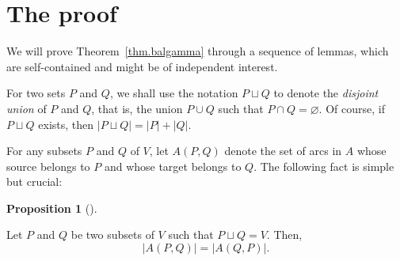 \documentclass[numbers=enddot,12pt,final,onecolumn,notitlepage]{scrartcl}%
\theoremstyle{definition}
\newtheorem{prop}[theo]{Proposition}
\newenvironment{proposition}[1][]
{\begin{prop}[#1]\begin{leftbar}}
{\end{leftbar}\end{prop}}
\theoremstyle{plainsl}
\begin{document}
\section{The proof}

We will prove Theorem~\ref{thm.balgamma} through a sequence of lemmas, which are self-contained and might be of independent interest.

For two sets $P$ and $Q$, we shall use the notation $P \sqcup Q$ to denote the \textit{disjoint union} of $P$ and $Q$, that is, the union $P \cup Q$ such that $P \cap Q = \varnothing$. Of course, if $P \sqcup Q$ exists, then $|P \sqcup Q| =|P|+|Q|$.

For any subsets $P$ and $Q$ of $V$, let $A(P,Q)$ denote the set of arcs in $A$ whose source belongs to $P$ and whose target belongs to $Q$. The following fact is simple but crucial:

\begin{proposition}
\label{prop.A-symmetry}Let $P$ and $Q$ be two subsets of $V$ such that
$P\sqcup Q=V$. Then,
\[
\left\vert A\left(  P,Q\right)  \right\vert =\left\vert A\left(  Q,P\right)
\right\vert .
\]

\end{proposition}
\end{document}
